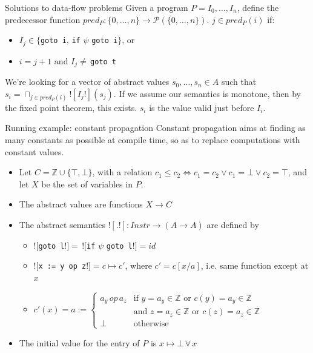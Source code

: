 \documentclass{beamer}
\begin{document}
\begin{frame}{Solutions to data-flow problems}
Given a program $P = I_0,\dots,I_n$, define the predecessor
function $pred_P: \{0,\dots,n\} \rightarrow \mathcal{P}(\{0,\dots,n\})$. $j \in pred_P(i)$ if:
\begin{itemize}
\item $I_j \in \{${\tt goto i}$, \, ${\tt if} $\psi$ {\tt goto i}$\} \text{, or }$
\item $i = j + 1 \text{ and } I_j \neq \, ${\tt goto t}
\end{itemize}
We're looking for a vector of abstract values $s_0,\dots,s_n \in A$ such
that $s_i = \sqcap_{j \in pred_P(i)} ![I_j!](s_j)$. If we assume our
semantics is monotone, then by the fixed point
theorem, this exists. $s_i$ is the value valid just before $I_i$.
\end{frame}

\begin{frame}{Running example: constant propagation}
Constant propagation aims at finding as many constants as possible at
compile time, so as to replace computations with constant values.
\begin{itemize}
\item Let $C = \mathbb{Z} \cup \{\top, \bot\}$, with
a relation $c_1 \leq c_2 \iff c_1 = c_2 \vee c_1 = \bot \vee c_2 = \top$,
and let $X$ be the set of variables in $P$.
\item The abstract values are functions $X \rightarrow C$
\item The abstract semantics $![.!] : Instr \rightarrow (A \rightarrow A)$
are defined by 
\begin{itemize}
\item $![${\tt goto l}$!] = \, ![${\tt if} $\psi$ {\tt goto l}$!] = id$
\item $![${\tt x := y op z}$!] = c \mapsto c'$, where $c' = c[x/a]$, i.e.
same function except at $x$
\item $c'(x) = a := \begin{cases}
a_y \, op \, a_z & \text{if } y = a_y \in \mathbb{Z} \text{ or } c(y) = a_y \in \mathbb{Z} \\
& \text{and } z = a_z \in \mathbb{Z} \text{ or } c(z) = a_z \in \mathbb{Z} \\
\bot & \text{otherwise}
\end{cases}$
\end{itemize}
\item The initial value for the entry of $P$ is 
$x \mapsto \bot \, \forall \, x$
\end{itemize}
\end{frame}
\end{document}
